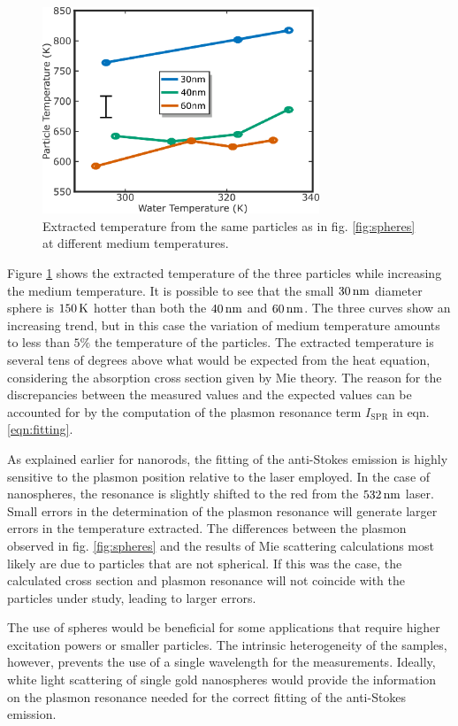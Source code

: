 \begin{figure}[tp] \centering
\includegraphics[width=82.7mm]{Chapters/04_Anti-Stokes/Figures/07_Spheres/07_spheres_02.png}
\caption{Extracted temperature from the same particles as in fig.
\ref{fig:spheres} at different medium temperatures. }
	\label{fig:spheres_temp}
\end{figure}

Figure \ref{fig:spheres_temp} shows the extracted temperature of the three
particles while increasing the medium temperature. It is possible to see that
the small $30\,\textrm{nm}$ diameter sphere is $150\,\textrm{K}$ hotter than both the $40\,\textrm{nm}$ and
$60\,\textrm{nm}$. The three curves show an increasing trend, but in this case the
variation of medium temperature amounts to less than $5\%$ the temperature of
the particles. The extracted temperature is several tens of degrees above what
would be expected from the heat equation, considering the absorption cross
section given by Mie theory. The reason for the discrepancies between the
measured values and the expected values can be accounted for by the computation
of the plasmon resonance term $I_\textrm{SPR}$ in eqn. \ref{eqn:fitting}.

As explained earlier for nanorods, the fitting of the anti-Stokes emission is
highly sensitive to the plasmon position relative to the laser employed. In the
case of nanospheres, the resonance is slightly shifted to the red from the
$532\,\textrm{nm}$ laser. Small errors in the determination of the plasmon resonance will
generate larger errors in the temperature extracted. The differences between the
plasmon observed in fig. \ref{fig:spheres} and the results of Mie scattering
calculations most likely are due to particles that are not spherical. If this
was the case, the calculated cross section and plasmon resonance will not
coincide with the particles under study, leading to larger errors.

The use of spheres would be beneficial for some applications that require higher
excitation powers or smaller particles. The intrinsic heterogeneity of the
samples, however, prevents the use of a single wavelength for the measurements.
Ideally, white light scattering of single gold nanospheres would provide the
information on the plasmon resonance needed for the correct fitting of the
anti-Stokes emission. 


